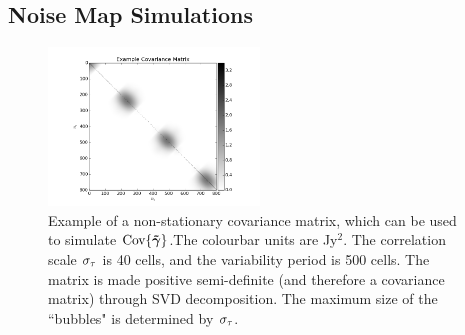 \subsection{Noise Map Simulations}\label{sec.simulations}



\begin{figure}[t!]
\centering
\includegraphics[width=0.5\textwidth]{images/CovarianceMatrix.png}
\caption{\label{fig.covmat} Example of {a non-stationary covariance matrix}, which can be used to simulate $\textrm{Cov}\{\bm{\tilde{\gamma}}\}$.{The colourbar units are Jy$^2$}. The correlation scale $\sigma_\tau$ is 40 cells, and the variability period is 500 cells. The matrix is made positive semi-definite (and therefore a covariance matrix) through SVD decomposition. The maximum size of the ``bubbles" is determined by $\sigma_\tau$.}
\end{figure}


